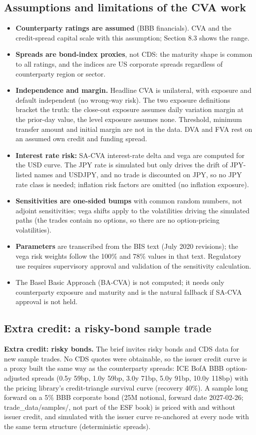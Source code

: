 \documentclass[11pt,letterpaper]{article}
\begin{document}
\subsection{Assumptions and limitations of the CVA work}
\begin{itemize}
\item \textbf{Counterparty ratings are assumed} (BBB financials). CVA and the credit-spread capital scale with this assumption; Section 8.3 shows the range.
\item \textbf{Spreads are bond-index proxies}, not CDS: the maturity shape is common to all ratings, and the indices are US corporate spreads regardless of counterparty region or sector.
\item \textbf{Independence and margin.} Headline CVA is unilateral, with exposure and default independent (no wrong-way risk). The two exposure definitions bracket the truth: the close-out exposure assumes daily variation margin at the prior-day value, the level exposure assumes none. Threshold, minimum transfer amount and initial margin are not in the data. DVA and FVA rest on an assumed own credit and funding spread.
\item \textbf{Interest rate risk:} SA-CVA interest-rate delta and vega are computed for the USD curve. The JPY rate is simulated but only drives the drift of JPY-listed names and USDJPY, and no trade is discounted on JPY, so no JPY rate class is needed; inflation risk factors are omitted (no inflation exposure).
\item \textbf{Sensitivities are one-sided bumps} with common random numbers, not adjoint sensitivities; vega shifts apply to the volatilities driving the simulated paths (the trades contain no options, so there are no option-pricing volatilities).
\item \textbf{Parameters} are transcribed from the BIS text (July 2020 revisions); the vega risk weights follow the 100\% and 78\% values in that text. Regulatory use requires supervisory approval and validation of the sensitivity calculation.
\item The Basel Basic Approach (BA-CVA) is not computed; it needs only counterparty exposure and maturity and is the natural fallback if SA-CVA approval is not held.
\end{itemize}
\subsection{Extra credit: a risky-bond sample trade}
\textbf{Extra credit: risky bonds.} The brief invites risky bonds and CDS data for new sample trades. No CDS quotes were obtainable, so the issuer credit curve is a proxy built the same way as the counterparty spreads: ICE BofA BBB option-adjusted spreads (0.5y 59bp, 1.0y 59bp, 3.0y 71bp, 5.0y 91bp, 10.0y 118bp) with the pricing library's credit-triangle survival curve (recovery 40\%). A sample long forward on a 5\% BBB corporate bond (25M notional, forward date 2027-02-26; trade\_data/samples/, not part of the ESF book) is priced with and without issuer credit, and simulated with the issuer curve re-anchored at every node with the same term structure (deterministic spreads).
\end{document}
